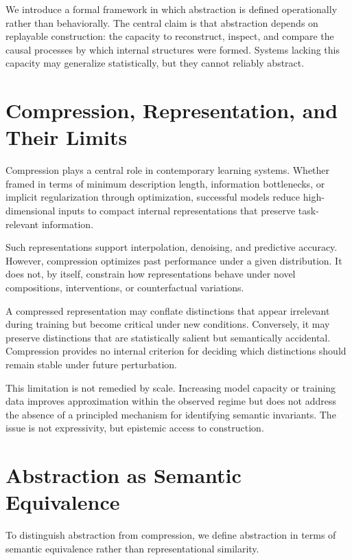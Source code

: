 \documentclass[11pt]{article}
\begin{document}
We introduce a formal framework in which abstraction is defined operationally rather than behaviorally. The central claim is that abstraction depends on replayable construction: the capacity to reconstruct, inspect, and compare the causal processes by which internal structures were formed. Systems lacking this capacity may generalize statistically, but they cannot reliably abstract.

\section{Compression, Representation, and Their Limits}

Compression plays a central role in contemporary learning systems. Whether framed in terms of minimum description length, information bottlenecks, or implicit regularization through optimization, successful models reduce high-dimensional inputs to compact internal representations that preserve task-relevant information.

Such representations support interpolation, denoising, and predictive accuracy. However, compression optimizes past performance under a given distribution. It does not, by itself, constrain how representations behave under novel compositions, interventions, or counterfactual variations.

A compressed representation may conflate distinctions that appear irrelevant during training but become critical under new conditions. Conversely, it may preserve distinctions that are statistically salient but semantically accidental. Compression provides no internal criterion for deciding which distinctions should remain stable under future perturbation.

This limitation is not remedied by scale. Increasing model capacity or training data improves approximation within the observed regime but does not address the absence of a principled mechanism for identifying semantic invariants. The issue is not expressivity, but epistemic access to construction.

\section{Abstraction as Semantic Equivalence}

To distinguish abstraction from compression, we define abstraction in terms of semantic equivalence rather than representational similarity.
\end{document}
